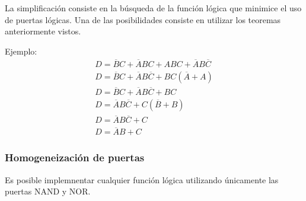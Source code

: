 \documentclass[a4paper, 11pt, titlepage]{article}
\begin{document}
		La simplificación consiste en la búsqueda de la función lógica que minimice el uso 
		de puertas lógicas. Una de las posibilidades consiste en utilizar los teoremas anteriormente 
		vistos.

		Ejemplo:
		\begin{gather*} 
			D = \overline{B}C + \overline{A}BC + ABC + \overline{A}B\overline{C} \\ 
			D = \overline{B}C + \overline{A}B\overline{C} + BC(\overline{A} + A) \\
			D = \overline{B}C + \overline{A}B\overline{C} + BC \\
			D = \overline{A}B\overline{C} + C(\overline{B} + B) \\
			D = \overline{A}B\overline{C} + C \\
			D = \overline{A}B+ C
		\end{gather*}

	\subsubsection{Homogeneización de puertas}

		Es posible implemnentar cualquier función lógica utilizando únicamente las puertas 
		NAND y NOR.
\end{document}
